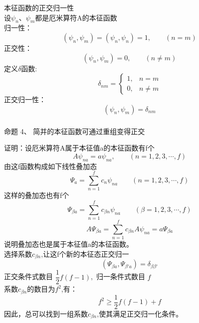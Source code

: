 \begin{frame} [allowframebreaks=]
    \frametitle{}
    \alert{本征函数的正交归一性}\\
    设$\psi_n$、$\psi_m$都是厄米算符A的本征函数\\
    归一性：
    \begin{equation*}
        (\psi_n, \psi_m)=(\psi_n, \psi_n)=1, \qquad (n=m)
    \end{equation*}  
    正交性：
    \begin{equation*}
        (\psi_n, \psi_m)=0, \qquad (n\neq m)
    \end{equation*}
    定义$\delta$函数:
    \begin{equation*}
        \delta_{n m}= 
        \begin{cases}1, & n=m \\ 
            0, & n \neq m
        \end{cases}
        \end{equation*}
    正交归一性：
    \begin{equation*}
        (\psi_n, \psi_m)=\delta_{nm}
    \end{equation*}
\end{frame} 

\begin{frame} [allowframebreaks=]
    \frametitle{}
    \begin{tcolorbox1}{命题 4、}
       简并的本征函数可通过重组变得正交
     \end{tcolorbox1}
    \alert{证明：}设厄米算符A属于本征值a的本征函数有f个
    \begin{equation*}
        A\psi_{na}=a\psi_{na}, \qquad (n=1,2,3,\cdots, f)
    \end{equation*}  
    由这f函数构成如下线性叠加态
    \begin{equation*}
        \Psi_a=\sum_{n=1}^{f} c_n \psi_{na} \qquad (n=1,2,3,\cdots, f)
    \end{equation*}
    这样的叠加态也有f个
    \begin{equation*}
        \Psi_{\beta a}=\sum_{n=1}^{f} c_{\beta n} \psi_{na} \qquad (\beta=1,2,3,\cdots, f)
    \end{equation*}
    \begin{equation*}
        A\Psi_{\beta a}=\sum_{n=1}^{f} c_{\beta n} A\psi_{na} =a \Psi_{\beta a}
    \end{equation*}
   说明叠加态也是属于本征值a的本征函数。\\
   选择系数$c_{\beta n}$,让这f个新的本征态正交归一
   \begin{equation*}
    (\Psi_{\beta a}, \Psi_{\beta' a})=\delta_{\beta\beta'}
    \end{equation*}
    正交条件式数目 $\dfrac{1}{2}f(f-1)$, 归一条件式数目 $f$\\
    系数$c_{\beta n}$的数目为$f^2$,有：$$ f^2\ge \dfrac{1}{2}f(f-1)+f$$
    因此，总可以找到一组系数$c_{\beta n}$,使其满足正交归一化条件。
\end{frame} 

